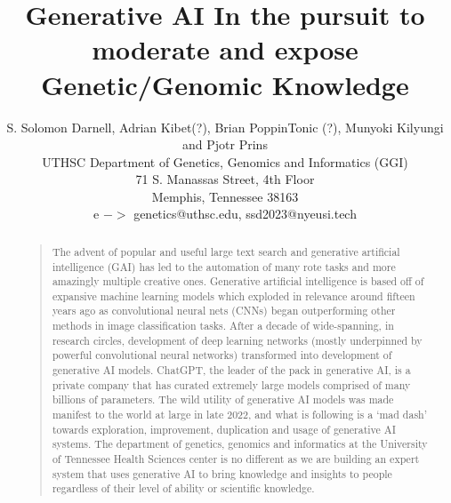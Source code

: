 \documentclass[letterpaper]{article}
\begin{document}
%
\title{Generative AI In the pursuit to moderate and expose\\ Genetic/Genomic Knowledge}
\author{S. Solomon Darnell, Adrian Kibet(?), Brian PoppinTonic (?), Munyoki Kilyungi and Pjotr Prins\\
UTHSC Department of Genetics, Genomics and Informatics (GGI)\\
71 S. Manassas Street, 4th Floor\\
Memphis, Tennessee 38163\\
e $->$ genetics@uthsc.edu, ssd2023@nyeusi.tech
}
\maketitle
\begin{abstract}
\begin{quote}
The advent of popular and useful large text search and generative artificial intelligence (GAI) has led to the automation of many rote tasks and more amazingly multiple creative ones.
Generative artificial intelligence is based off of expansive machine learning models which exploded in relevance around fifteen years ago as convolutional neural nets (CNNs) began outperforming other methods in image classification tasks.
After a decade of wide-spanning, in research circles, development of deep learning networks (mostly underpinned by powerful convolutional neural networks) transformed into development of generative AI models.
ChatGPT, the leader of the pack in generative AI, is a private company that has curated extremely large models comprised of many billions of parameters.
The wild utility of generative AI models was made manifest to the world at large in late 2022, and what is following is a `mad dash' towards exploration, improvement, duplication and usage of generative AI systems. 
The department of genetics, genomics and informatics at the University of Tennessee Health Sciences center is no different as we are building an expert system that uses generative AI to bring knowledge and insights to people regardless of their level of ability or scientific knowledge.
\end{quote}
\end{abstract}














\end{document}
